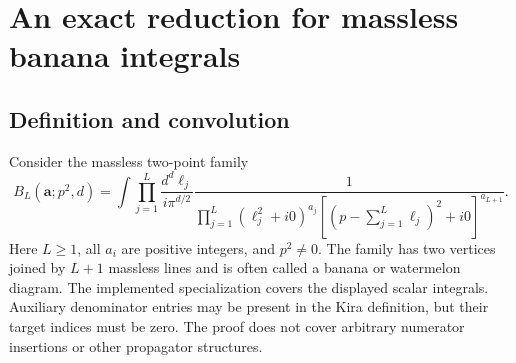 \section{An exact reduction for massless banana integrals}
\label{app:banana}
\subsection{Definition and convolution}
Consider the massless two-point family
\begin{equation}
 B_L(\boldsymbol a;p^2,d)=
 \int\prod_{j=1}^{L}\frac{d^d\ell_j}{i\pi^{d/2}}
 \frac{1}{\prod_{j=1}^{L}(\ell_j^2+i0)^{a_j}
 [(p-\sum_{j=1}^{L}\ell_j)^2+i0]^{a_{L+1}}}.
 \label{eq:banana-family}
\end{equation}
Here $L\geq1$, all $a_i$ are positive integers, and $p^2\ne0$. The family
has two vertices joined by $L+1$ massless lines and is often called a banana
or watermelon diagram. The implemented specialization covers the displayed
scalar integrals. Auxiliary denominator entries may be present in the Kira
definition, but their target indices must be zero. The proof does not cover
arbitrary numerator insertions or other propagator structures.


